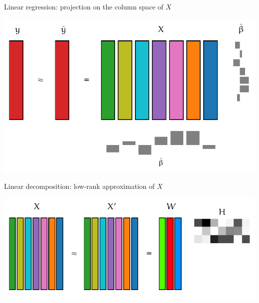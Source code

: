 \documentclass[presentation,mathserif,table]{beamer}
\begin{document}
\begin{frame}[label={sec:orgedec664}]{Linear regression: projection on the column space of \(X\)}
\begin{center}
\includegraphics[height=.7\textheight]{figures/generated/dim_reduction_colors/regression_full_3.pdf}
\end{center}
\end{frame}
\begin{frame}[label={sec:orgf74c7d9}]{Linear decomposition: low-rank approximation of \(X\)}
\begin{center}
\includegraphics[height=.5\textheight]{figures/generated/dim_reduction_colors/factorization_3.pdf}
\end{center}
\end{frame}
\end{document}
